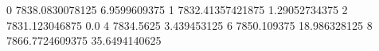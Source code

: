 0 7838.0830078125 6.9599609375
1 7832.41357421875 1.29052734375
2 7831.123046875 0.0
4 7834.5625 3.439453125
6 7850.109375 18.986328125
8 7866.7724609375 35.6494140625
